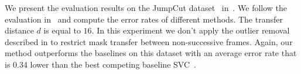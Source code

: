 We present the evaluation results on the JumpCut dataset~\cite{FanTOG15} in~.  We follow the evaluation in~\cite{FanTOG15} and compute the error rates of different methods. The transfer distance $d$ is equal to $16$. In this experiment we don't apply the outlier removal described in  to restrict mask transfer between non-successive frames. Again, our method outperforms the baselines on this dataset with an average error rate that is 0.34 lower than the best competing baseline SVC~\cite{WangTIP2017}.
\begin{table}[t]
	\centering
	{\small
		\caption{Error rates on the JumpCut dataset~\cite{FanTOG15}. The transfer distance $d$ is $16$.
		}
		\label{tab:jumpcut}
		\tabcolsep=3pt
		}
\end{table}
